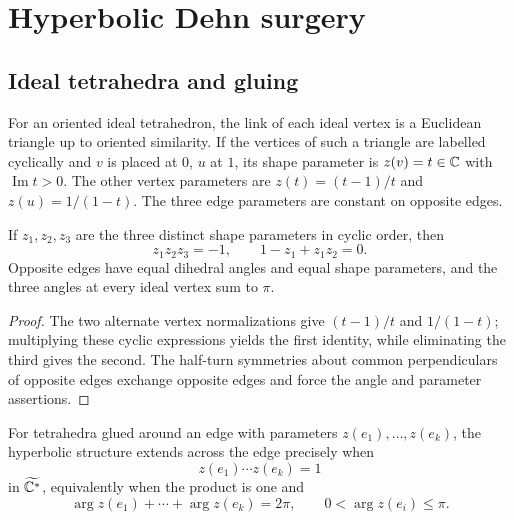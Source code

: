 \chapter{Hyperbolic Dehn surgery}

\section{Ideal tetrahedra and gluing}

\begin{definition}
\label{thurston-ch04-ideal-tetrahedron-shape}

For an oriented ideal tetrahedron, the link of each ideal vertex is a Euclidean triangle up to oriented similarity. If the vertices of such a triangle are labelled cyclically and \(v\) is placed at \(0\), \(u\) at \(1\), its shape parameter is \(z(v)=t\in\mathbb{C}\) with \(\operatorname{Im}t>0\). The other vertex parameters are \(z(t)=(t-1)/t\) and \(z(u)=1/(1-t)\). The three edge parameters are constant on opposite edges.
\end{definition}

\begin{proposition}
\label{thurston-ch04-shape-identities}
If \(z_1,z_2,z_3\) are the three distinct shape parameters in cyclic order, then
\[
 z_1z_2z_3=-1,\qquad 1-z_1+z_1z_2=0.
\]
Opposite edges have equal dihedral angles and equal shape parameters, and the three angles at every ideal vertex sum to \(\pi\).

\end{proposition}

\begin{proof}
\sketch The two alternate vertex normalizations give \((t-1)/t\) and \(1/(1-t)\); multiplying these cyclic expressions yields the first identity, while eliminating the third gives the second. The half-turn symmetries about common perpendiculars of opposite edges exchange opposite edges and force the angle and parameter assertions.
\end{proof}

\begin{proposition}
\label{thurston-ch04-ideal-edge-gluing}
For tetrahedra glued around an edge with parameters \(z(e_1),\ldots,z(e_k)\), the hyperbolic structure extends across the edge precisely when
\[
 z(e_1)\cdots z(e_k)=1
\]
in \(\widetilde{\mathbb{C}^*}\), equivalently when the product is one and
\[
 \arg z(e_1)+\cdots+\arg z(e_k)=2\pi,\qquad 0<\arg z(e_i)\leq\pi.
\]

\end{proposition}

